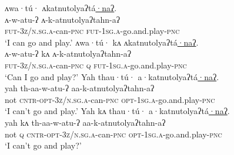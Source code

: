 \documentclass[output=paper,colorlinks,citecolor=brown]{langscibook}
\begin{document}
\ea\label{oneida:can}
    \ea\label{oneida:can-a}
        \glll\Large ʌ\normalsize wa·tú· ʌkatnutolyaʔtá\uline{·naʔ}. \\
        \Large ʌ\normalsize -w-atu-ʔ ʌ-k-atnutolyaʔtahn-aʔ \\
        \textsc{fut-3z/n.sg.a}-can-\textsc{pnc} \textsc{fut-1sg.a}-go.and.play-\textsc{pnc} \\
        \glt `I can go and play.'
    \ex\label{oneida:can-b}
        \glll\Large ʌ\normalsize wa·tú· kʌ ʌkatnutolyaʔtá\uline{·naʔ}. \\
        \Large ʌ\normalsize -w-atu-ʔ kʌ ʌ-k-atnutolyaʔtahn-aʔ \\
        \textsc{fut-3z/n.sg.a}-can-\textsc{pnc} \textsc{q} \textsc{fut-1sg.a}-go.and.play-\textsc{pnc} \\
        \glt `Can I go and play?'
    \ex\label{oneida:can-c}
        \glll Yah thau·tú· a·katnutolyaʔtá\uline{·naʔ}. \\
    yah th-aa-w-atu-ʔ aa-k-atnutolyaʔtahn-aʔ \\
    not \textsc{cntr-opt-3z/n.sg.a}-can-\textsc{pnc} \textsc{opt-1sg.a}-go.and.play-\textsc{pnc}\\
    \glt `I can't go and play.'
    \ex\label{oneida:can-d}
        \glll Yah kʌ thau·tú· a·katnutolyaʔtá\uline{·naʔ}. \\
        yah kʌ th-aa-w-atu-ʔ aa-k-atnutolyaʔtahn-aʔ \\
        not \textsc{q} \textsc{cntr-opt-3z/n.sg.a}-can-\textsc{pnc} \textsc{opt-1sg.a}-go.and.play-\textsc{pnc} \\
        \glt `I can't go and play?'
    \z
\z
\end{document}
